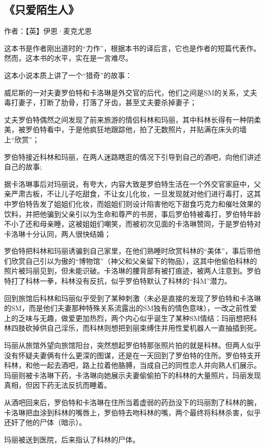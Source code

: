 \subsection{《只爱陌生人》}

作者：【英】伊恩·麦克尤恩

这本书是作者刚出道时的“力作”，根据本书的译后言，它也是作者的短篇代表作。然而，这本书的水平，实在是一言难尽。

这本小说本质上讲了一个“猎奇”的故事：
\begin{itemize*}
    \item 威尼斯的一对夫妻罗伯特和卡洛琳是外交官的后代，他们之间是SM的关系，丈夫毒打妻子，打断了肋骨，打落了牙齿，甚至丈夫要杀掉妻子；
    \item 丈夫罗伯特偶然之间发现了前来旅游的情侣科林和玛丽，其中科林长得有一种阴柔美，被罗伯特看中，于是他疯狂地跟踪他，拍了无数照片，并贴满在床头的墙上“欣赏”；
    \item 罗伯特接近科林和玛丽，在两人迷路瞎逛的情况下引导到自己的酒吧，向他们讲述自己的故事;
    \item 据卡洛琳事后对玛丽说，有夸大，内容大致是罗伯特生活在一个外交官家庭中，父亲严肃古板，不让儿子吃甜食，不让女儿化妆，一旦发现就对他们进行毒打，这其中罗伯特告发了姐姐们化妆，而姐姐们则设计陷害他吃下甜食巧克力和催吐效果的饮料，并把他骗到父亲引以为生命和尊严的书房，事后罗伯特被毒打，罗伯特年龄不小了还和母亲睡，这被姐姐们嘲笑，而被初次见面的卡洛琳赞同，于是罗伯特对卡洛琳十分认同，两人很快结婚；
    \item 罗伯特把科林和玛丽诱骗到自己家里，在他们熟睡时欣赏科林的“美体”，事后带他们欣赏自己引以为傲的“博物馆”（神父和父亲留下的物品），这其中他偷伯科林的照片被玛丽见到，但未能识破。卡洛琳的腰背部有被打痕迹，被两人注意到。罗伯特打了科林一拳，科林没有反抗，似乎罗伯特默认了科林的“抖M”潜力。
    \item 回到旅馆后科林和玛丽似乎受到了某种刺激（未必是直接的发现了罗伯特和卡洛琳的SM，而是他们夫妻那种特殊关系流露出的SM独有的情色意味），一改之前性爱上的乏味与无趣，做爱更加热烈，两个内心似乎诞生了某种SM情结：玛丽想把科林四肢砍掉供自己淫乐，而科林则想把到丽束缚住并用性爱机器人一直抽插到死。
    \item 玛丽从旅馆外望向旅馆阳台，突然想起罗伯特那张照片拍的就是科林。但两人似乎没有怀疑夫妻俩有什么更深的图谋，还是在一天回到了罗伯特的住所。罗伯特支开科林，和他一起去酒吧，路上拉着他胳膊，当成自己的同性恋人并向熟人们展示。玛丽则被卡洛琳下药，卡洛琳向她展示夫妻偷偷拍下的科林的大量照片，玛丽发现真相，但因下药无法反抗而睡着。
    \item 从酒吧回来后，罗伯特和卡洛琳在住所当着虚弱的药劲没下的玛丽割了科林的腕，卡洛琳把血涂到科林的嘴唇上，罗伯特去吻科林的嘴，两个最终将科林杀害，似乎还奸了他的尸体（暗示）。
    \item 玛丽被送到医院，后来指认了科林的尸体。
\end{itemize*}


